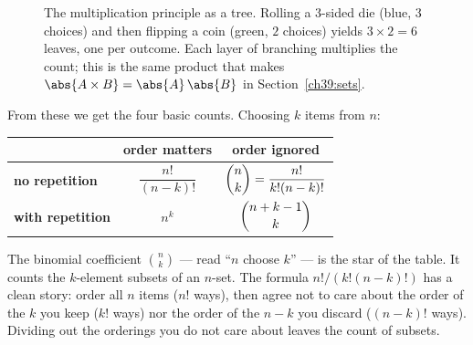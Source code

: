 \begin{figure}[H]
\centering
{}
\caption{The multiplication principle as a tree. Rolling a $3$-sided die (blue,
$3$ choices) and then flipping a coin (green, $2$ choices) yields
$3 \times 2 = 6$ leaves, one per outcome. Each layer of branching multiplies
the count; this is the same product that makes $\abs{A\times B}=\abs{A}\,
\abs{B}$ in Section~\ref{ch39:sets}.}
\label{ch39:treefig}
\end{figure}

From these we get the four basic counts. Choosing $k$ items from $n$:

\begin{center}
\begin{tabular}{lcc}
\toprule
 & \textbf{order matters} & \textbf{order ignored}\\
\midrule
\textbf{no repetition} & $\dfrac{n!}{(n-k)!}$ & $\dbinom{n}{k} =
  \dfrac{n!}{k!(n-k)!}$\\[1.2em]
\textbf{with repetition} & $n^{k}$ & $\dbinom{n+k-1}{k}$\\
\bottomrule
\end{tabular}
\end{center}

\begin{intuitionbox}
The binomial coefficient $\binom{n}{k}$ --- read ``$n$ choose $k$'' --- is the
star of the table. It counts the $k$-element subsets of an $n$-set. The formula
$n!/(k!(n-k)!)$ has a clean story: order all $n$ items ($n!$ ways), then agree
not to care about the order of the $k$ you keep ($k!$ ways) nor the order of
the $n-k$ you discard ($(n-k)!$ ways). Dividing out the orderings you do not
care about leaves the count of subsets.
\end{intuitionbox}

